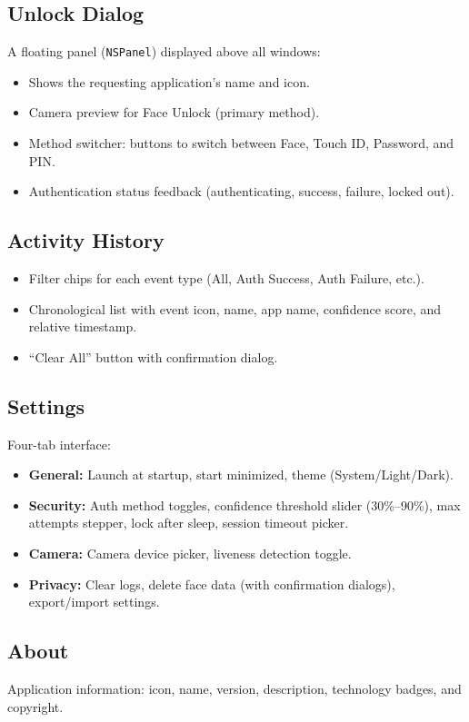 \documentclass[12pt,a4paper]{report}
\begin{document}
\subsection{Unlock Dialog}
A floating panel (\texttt{NSPanel}) displayed above all windows:
\begin{itemize}[noitemsep]
    \item Shows the requesting application's name and icon.
    \item Camera preview for Face Unlock (primary method).
    \item Method switcher: buttons to switch between Face, Touch ID, Password, and PIN.
    \item Authentication status feedback (authenticating, success, failure, locked out).
\end{itemize}

\subsection{Activity History}
\begin{itemize}[noitemsep]
    \item Filter chips for each event type (All, Auth Success, Auth Failure, etc.).
    \item Chronological list with event icon, name, app name, confidence score, and relative timestamp.
    \item ``Clear All'' button with confirmation dialog.
\end{itemize}

\subsection{Settings}
Four-tab interface:
\begin{itemize}[noitemsep]
    \item \textbf{General:} Launch at startup, start minimized, theme (System/Light/Dark).
    \item \textbf{Security:} Auth method toggles, confidence threshold slider (30\%--90\%), max attempts stepper, lock after sleep, session timeout picker.
    \item \textbf{Camera:} Camera device picker, liveness detection toggle.
    \item \textbf{Privacy:} Clear logs, delete face data (with confirmation dialogs), export/import settings.
\end{itemize}

\subsection{About}
Application information: icon, name, version, description, technology badges, and copyright.
\end{document}
